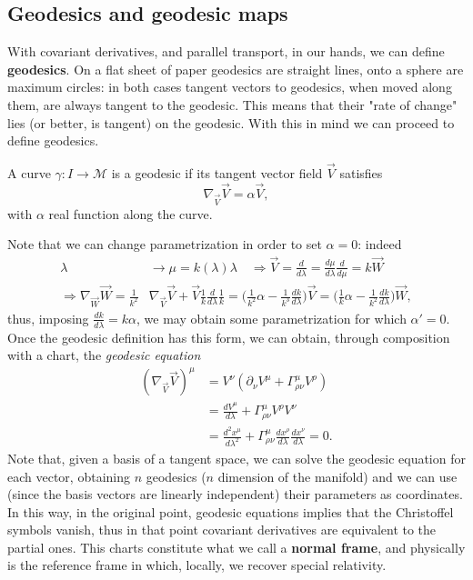 \subsection{Geodesics and geodesic maps}
With covariant derivatives, and parallel transport, in our hands, we can define \textbf{geodesics}. On a flat sheet of paper geodesics are straight lines, onto a sphere are maximum circles: in both cases tangent vectors to geodesics, when moved along them, are always tangent to the geodesic. This means that their "rate of change" lies (or better, is tangent) on the geodesic. With this in mind we can proceed to define geodesics.
\begin{defin}[Geodesics]
    A curve $\gamma:I\rightarrow\mathcal{M}$ is a geodesic if its tangent vector field $\vec V$ satisfies$$\nabla_{\vec V}\vec V=\alpha\vec V,$$ with $\alpha$ real function along the curve.
\end{defin}
Note that we can change parametrization in order to set $\alpha=0$: indeed
\begin{align*}
    \lambda &\rightarrow\mu=k(\lambda)\lambda\quad \Rightarrow \vec V=\frac{d}{d\lambda}=\frac{d\mu}{d\lambda}\frac{d}{d\mu}=k\vec W\\ \Rightarrow
    \nabla_{\vec W}\vec W=\frac{1}{k^2}&\nabla_{\vec V}\vec V+\vec V\frac{1}{k}\frac{d}{d\lambda}\frac{1}{k}=\bigg(\frac{1}{k^2}\alpha-\frac{1}{k^3}\frac{dk}{d\lambda}\bigg)\vec V=\bigg(\frac{1}{k}\alpha-\frac{1}{k^2}\frac{dk}{d\lambda}\bigg)\vec W,
\end{align*}
thus, imposing $\frac{dk}{d\lambda}=k\alpha$, we may obtain some parametrization for which $\alpha'=0$.\\
Once the geodesic definition has this form, we can obtain, through composition with a chart, the \emph{geodesic equation}
\begin{align*}
    (\nabla_{\vec V}\vec V)^\mu&=V^\nu(\partial_\nu V^\mu+\Gamma^\mu_{\rho\nu}V^\rho)\\
    &=\frac{dV^\mu}{d\lambda}+\Gamma^\mu_{\rho\nu}V^\rho V^\nu\\
    &=\frac{d^2x^\mu}{d\lambda^2}+\Gamma^\mu_{\rho\nu}\frac{dx^\rho}{d\lambda}\frac{dx^\nu}{d\lambda}=0.
\end{align*}
Note that, given a basis of a tangent space, we can solve the geodesic equation for each vector, obtaining $n$ geodesics ($n$ dimension of the manifold) and we can use (since the basis vectors are linearly independent) their parameters as coordinates. In this way, in the original point, geodesic equations implies that the Christoffel symbols vanish, thus in that point covariant derivatives are equivalent to the partial ones. This charts constitute what we call a \textbf{normal frame}, and physically is the reference frame in which, locally, we recover special relativity.\\

